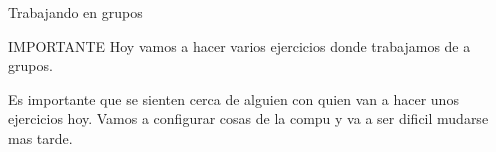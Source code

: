 \begin{frame}{Trabajando en grupos}
    \begin{block}{IMPORTANTE}
        Hoy vamos a hacer varios ejercicios donde trabajamos de a grupos.

        Es importante que se sienten cerca de alguien con quien van a hacer unos
        ejercicios hoy. Vamos a configurar cosas de la compu y va a ser dificil
        mudarse mas tarde.

    \end{block}
\end{frame}
